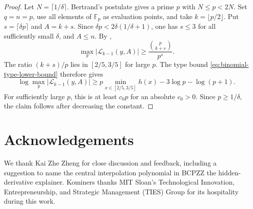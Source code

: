 \documentclass[11pt,letterpaper]{article}
\theoremstyle{definition}
\newcommand{\F}{\mathbb{F}}
\newcommand{\List}{\mathcal{L}}
\begin{document}
\begin{proof}
Let \(N=\lceil1/\delta\rceil\).  Bertrand's postulate gives a prime
\(p\) with \(N\le p<2N\).  Set \(q=n=p\), use all elements of
\(\F_p\) as evaluation points, and take \(k=\lfloor p/2\rfloor\).
Put \(s=\lceil\delta p\rceil\) and \(A=k+s\).  Since
\(\delta p<2\delta(1/\delta+1)\), one has \(s\le3\) for all sufficiently
small \(\delta\), and \(A\le n\).  By
,
\[
  \max_y|\List_{k-1}(y,A)|
  \ge
  \frac{\binom p{k+s}}{p^s}.
\]
The ratio \((k+s)/p\) lies in \([2/5,3/5]\) for large \(p\).  The type
bound \eqref{eq:binomial-type-lower-bound} therefore gives
\[
  \log\max_y|\List_{k-1}(y,A)|
  \ge
  p\min_{x\in[2/5,3/5]}h(x)-3\log p-\log(p+1).
\]
For sufficiently large \(p\), this is at least \(c_0p\) for an absolute
\(c_0>0\).  Since \(p\ge1/\delta\), the claim follows after decreasing
the constant.
\end{proof}
 \section*{Acknowledgements}
We thank Kai Zhe Zheng for close discussion and feedback, including a suggestion to name the central interpolation polynomial in BCPZZ the hidden-derivative explainer.
Kominers thanks MIT Sloan's Technological Innovation, Entrepreneurship,
and Strategic Management (TIES) Group for its hospitality during this work.
\end{document}
